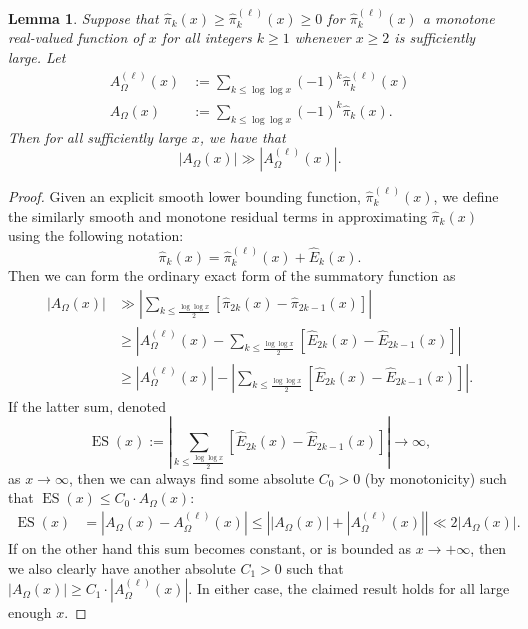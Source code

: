 \documentclass[11pt,reqno,a4letter]{article}
\numberwithin{figure}{section}
\numberwithin{table}{section}
\theoremstyle{plain}
\newtheorem{lemma}[theorem]{Lemma}
\numberwithin{theorem}{section}
\theoremstyle{definition}
\begin{document}
\begin{lemma} 
\label{lemma_lowerBoundsOnLambdaFuncParitySummFuncs} 
Suppose that $\widehat{\pi}_k(x) \geq \widehat{\pi}_k^{(\ell)}(x) \geq 0$ 
for $\widehat{\pi}_k^{(\ell)}(x)$ a monotone real-valued function of $x$ 
for all integers $k \geq 1$ whenever $x \geq 2$ is sufficiently large. 
Let 
\begin{align*} 
A_{\Omega}^{(\ell)}(x) & := \sum_{k \leq \log\log x} (-1)^k \widehat{\pi}_k^{(\ell)}(x) \\ 
A_{\Omega}(x) & := \sum_{k \leq \log\log x} (-1)^k \widehat{\pi}_k(x). 
\end{align*} 
Then for all sufficiently large $x$, we have that 
$$|A_{\Omega}(x)| \gg |A_{\Omega}^{(\ell)}(x)|.$$ 
\end{lemma} 
\begin{proof} 
Given an explicit smooth lower bounding function, $\widehat{\pi}_k^{(\ell)}(x)$, we define the 
similarly smooth and monotone residual terms in approximating $\widehat{\pi}_k(x)$ 
using the following notation: 
\[
\widehat{\pi}_k(x) = \widehat{\pi}_k^{(\ell)}(x) + \widehat{E}_k(x). 
\]
Then we can form the ordinary exact form of the summatory function as 
\begin{align*} 
|A_{\Omega}(x)| & \gg \left\lvert \sum_{k \leq \frac{\log\log x}{2}} 
     \left[\widehat{\pi}_{2k}(x) - \widehat{\pi}_{2k-1}(x)\right] \right\rvert \\ 
     & \geq \left\lvert A_{\Omega}^{(\ell)}(x) - \sum_{k \leq \frac{\log\log x}{2}} 
     \left[\widehat{E}_{2k}(x) - \widehat{E}_{2k-1}(x)\right] 
     \right\rvert \\ 
     & \geq 
     \left\lvert A_{\Omega}^{(\ell)}(x) \right\rvert - 
     \left\lvert \sum_{k \leq \frac{\log\log x}{2}} 
     \left[\widehat{E}_{2k}(x) - \widehat{E}_{2k-1}(x)\right]
     \right\rvert. 
\end{align*} 
If the latter sum, denoted 
$$\operatorname{ES}(x) := \left\lvert \sum_{k \leq \frac{\log\log x}{2}} 
   \left[\widehat{E}_{2k}(x) - \widehat{E}_{2k-1}(x)\right] \right\rvert \rightarrow \infty,$$ as 
$x \rightarrow \infty$, then we can always find some absolute $C_0 > 0$ (by monotonicity) such that 
$\operatorname{ES}(x) \leq C_0 \cdot A_{\Omega}(x)$: 
\begin{align*} 
\operatorname{ES}(x) & = \left\lvert A_{\Omega}(x) - A_{\Omega}^{(\ell)}(x) \right\rvert 
     \leq \left\lvert |A_{\Omega}(x)| + 
     \left\lvert A_{\Omega}^{(\ell)}(x) \right\rvert \right\rvert 
     \ll 2 \left\lvert A_{\Omega}(x) \right\rvert. 
\end{align*} 
If on the other hand this sum becomes constant, or is bounded 
as $x \rightarrow +\infty$, then we also clearly have another absolute $C_1 > 0$ such that 
$|A_{\Omega}(x)| \geq C_1 \cdot |A_{\Omega}^{(\ell)}(x)|$. 
In either case, the claimed result holds for all large enough $x$. 
\end{proof} 
\end{document}
